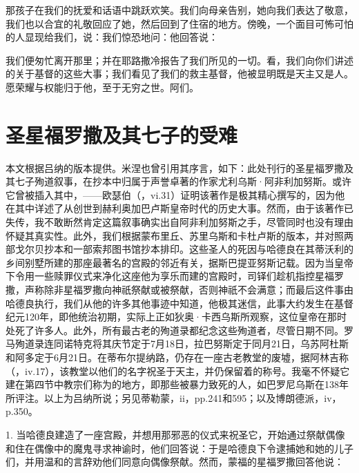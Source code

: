 那孩子在我们的抚爱和话语中跳跃欢笑。我们向母亲告别，她向我们表达了敬意，我们也以合宜的礼敬回应了她，然后回到了住宿的地方。傍晚，一个面目可怖可怕的人显现给我们，说：我们惊恐地问：他回答说：\par

我们便匆忙离开那里；并在耶路撒冷报告了我们所见的一切。看，我们向你们讲述的关于基督的这些大事；我们看见了我们的救主基督，他被显明既是天主又是人。愿荣耀与权能归于他，至于无穷之世。阿们。\par


\section{圣星福罗撒及其七子的受难}

本文根据吕纳的版本提供。米涅也曾引用其序言，如下：此处刊行的圣星福罗撒及其七子殉道叙事，在抄本中归属于声誉卓著的作家尤利乌斯·阿非利加努斯。或许它曾被插入其中，——欧瑟伯（，vi.31）证明该著作是极其精心撰写的，因为他在其中详述了从创世到赫利奥加巴卢斯皇帝时代的历史大事。然而，由于该著作已失传，我不敢断然肯定这篇叙事确实出自阿非利加努斯之手，尽管同时也没有理由怀疑其真实性。此外，我们根据蒙布里丘、苏里乌斯和卡杜卢斯的版本，并对照两部戈尔贝抄本和一部索邦图书馆抄本排印。这些圣人的死因与哈德良在其蒂沃利的乡间别墅所建的那座最著名的宫殿的邻近有关，据斯巴提亚努斯记载。因为当皇帝下令用一些赎罪仪式来净化这座他为享乐而建的宫殿时，司铎们趁机指控星福罗撒，声称除非星福罗撒向神祇祭献或被祭献，否则神祇不会满意；而最后这件事由哈德良执行，我们从他的许多其他事迹中知道，他极其迷信，此事大约发生在基督纪元120年，即他统治初期，实际上正如狄奥·卡西乌斯所观察，这位皇帝在那时处死了许多人。此外，所有最古老的殉道录都纪念这些殉道者，尽管日期不同。罗马殉道录连同诺特克将其庆节定于7月18日，拉巴努斯定于同月21日，乌苏阿杜斯和阿多定于6月21日。在蒂布尔提纳路，仍存在一座古老教堂的废墟，据阿林吉称（，iv.17），该教堂以他们的名字祝圣于天主，并仍保留着的称号。我毫不怀疑它建在第四节中教宗们称为的地方，即那些被暴力致死的人，如巴罗尼乌斯在138年所评注。以上为吕纳所说；另见蒂勒蒙，ii，pp.241和595；以及博朗德派，iv，p.350。\par

1. 当哈德良建造了一座宫殿，并想用那邪恶的仪式来祝圣它，开始通过祭献偶像和住在偶像中的魔鬼寻求神谕时，他们回答说：于是哈德良下令逮捕她和她的儿子们，并用温和的言辞劝他们同意向偶像祭献。然而，蒙福的星福罗撒回答他说：\par

